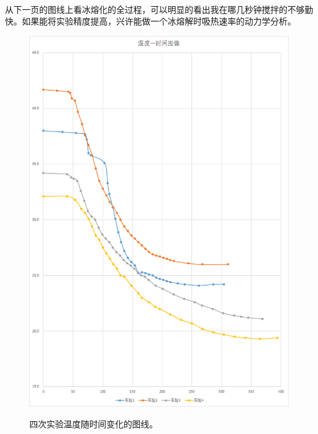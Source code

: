 \documentclass{article} %
\begin{document}
\paragraph{}
从下一页的图线上看冰熔化的全过程，可以明显的看出我在哪几秒钟搅拌的不够勤快。如果能将实验精度提高，兴许能做一个冰熔解时吸热速率的动力学分析。

\begin{figure}
{\includegraphics{fig.png}}
\caption{四次实验温度随时间变化的图线。}
\end{figure}
\end{document}
